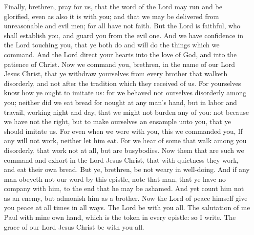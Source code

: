 Finally, brethren, pray for us, that the word of the Lord may run and be glorified, even as also it is with you; and that we may be delivered from unreasonable and evil men; for all have not faith. But the Lord is faithful, who shall establish you, and guard you from the evil one. And we have confidence in the Lord touching you, that ye both do and will do the things which we command. And the Lord direct your hearts into the love of God, and into the patience of Christ.  Now we command you, brethren, in the name of our Lord Jesus Christ, that ye withdraw yourselves from every brother that walketh disorderly, and not after the tradition which they received of us. For yourselves know how ye ought to imitate us: for we behaved not ourselves disorderly among you; neither did we eat bread for nought at any man’s hand, but in labor and travail, working night and day, that we might not burden any of you: not because we have not the right, but to make ourselves an ensample unto you, that ye should imitate us. For even when we were with you, this we commanded you, If any will not work, neither let him eat. For we hear of some that walk among you disorderly, that work not at all, but are busybodies. Now them that are such we command and exhort in the Lord Jesus Christ, that with quietness they work, and eat their own bread. But ye, brethren, be not weary in well-doing. And if any man obeyeth not our word by this epistle, note that man, that ye have no company with him, to the end that he may be ashamed. And yet count him not as an enemy, but admonish him as a brother.  Now the Lord of peace himself give you peace at all times in all ways. The Lord be with you all.  The salutation of me Paul with mine own hand, which is the token in every epistle: so I write. The grace of our Lord Jesus Christ be with you all. 